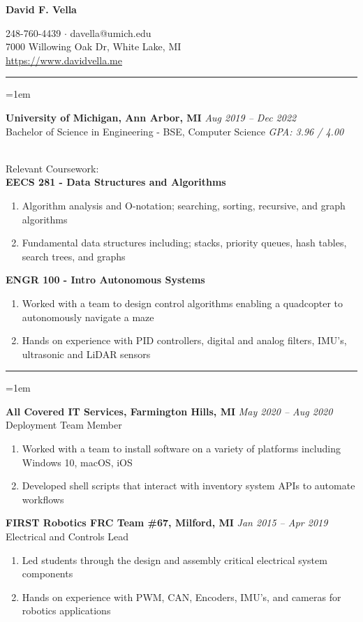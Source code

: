 \documentclass[12pt]{article}
\newcommand{\rheader}[1] { 
    \noindent{ 
        \large 
        \textbf{#1} 
        \par 
    }
    \vspace{-10pt}
    \noindent 
    \rule{7.5in}{0.5pt} 
}
\newcommand{\rdate}[1] {
    \hfill 
    \textit{#1}
}
\newcommand{\ritem} {
    \vspace{-10pt} 
    \item
}
\newcommand{\rurl}[1] {
	\textcolor{blue} {
        \small{
            \uline{
                \url{#1}
            }
        }
    }
}
\newenvironment{rsection} {
    \vspace{-5pt}
    \par 
    \medskip
    \leftskip=1em
    \noindent 
    \ignorespaces
} {
    \par 
    \medskip
    \vspace{5pt}
}
\newenvironment{rlist} {
    \begin{enumerate}[leftmargin=0.5in, label=$\bullet$]
} {
    \end{enumerate}
    \vspace{-10pt}
}
\begin{document}


\begin{center} %
    {\Large \textbf{David F. Vella} \par}
    \vspace{5pt}
    248-760-4439 $\cdot$ davella@umich.edu \\
    7000 Willowing Oak Dr, White Lake, MI \\
    \rurl{https://www.davidvella.me}
\end{center}
\vspace{-10pt}


\rheader{EDUCATION}
\begin{rsection}
    \textbf{University of Michigan, Ann Arbor, MI} \rdate{Aug 2019 -- Dec 2022} \\
    Bachelor of Science in Engineering - BSE, Computer Science \rdate{GPA: 3.96 / 4.00}
    \vspace{5pt} \\
    \noindent Relevant Coursework: \\
    \textbf{EECS 281 - Data Structures and Algorithms}
    \begin{rlist}
        \ritem Algorithm analysis and O-notation; searching, sorting, recursive, and graph algorithms
        \ritem Fundamental data structures including; stacks, priority queues, hash tables, search trees, and graphs
    \end{rlist}
    \textbf{ENGR 100 - Intro Autonomous Systems}
    \begin{rlist}
        \ritem Worked with a team to design control algorithms enabling a quadcopter to autonomously navigate a maze
        \ritem Hands on experience with PID controllers, digital and analog filters, IMU's, ultrasonic and LiDAR sensors
    \end{rlist}
\end{rsection}


\rheader{EXPERIENCE}
\begin{rsection}
    \textbf{All Covered IT Services, Farmington Hills, MI} \rdate{May 2020 -- Aug 2020} \\
    Deployment Team Member
    \begin{rlist}
        \ritem Worked with a team to install software on a variety of platforms including Windows 10, macOS, iOS
        \ritem Developed shell scripts that interact with inventory system APIs to automate workflows
    \end{rlist}
    \vspace{5pt}
    \textbf{FIRST Robotics FRC Team \#67, Milford, MI} \rdate{Jan 2015 -- Apr 2019} \\
    Electrical and Controls Lead
    \begin{rlist}
        \ritem Led students through the design and assembly critical electrical system components
        \ritem Hands on experience with PWM, CAN, Encoders, IMU's, and cameras for robotics applications
    \end{rlist}
\end{rsection}
\end{document}
